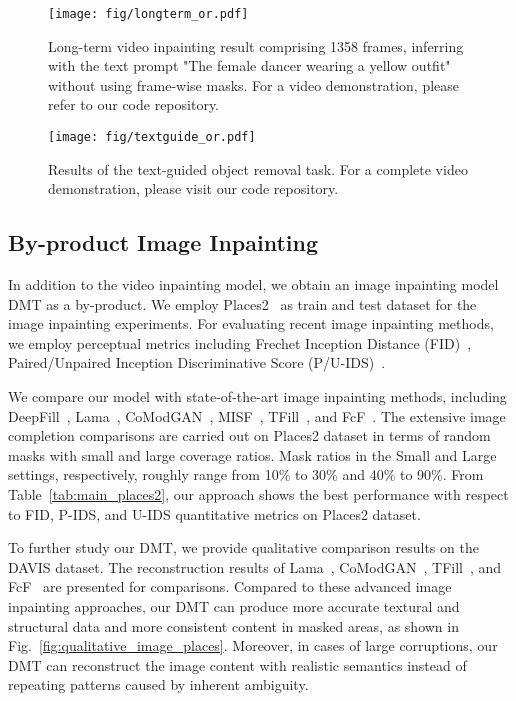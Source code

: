 \documentclass[10pt,twocolumn,letterpaper]{article}
\begin{document}
\begin{figure*}[t]
  \centering
  \texttt{[image: fig/longterm\_or.pdf]}
  \vspace{-5mm}
  \caption{Long-term video inpainting result comprising 1358 frames, inferring with the text prompt "The female dancer wearing a yellow outfit" without using frame-wise masks. For a video demonstration, please refer to our code repository.}\label{fig:longterm_or}
  \vspace{-3mm}
\end{figure*}


\begin{figure*}[t]
  \centering
  \texttt{[image: fig/textguide\_or.pdf]}
\caption{Results of the text-guided object removal task. For a complete video demonstration, please visit our code repository.}\label{fig:textguide_or}
  \vspace{-3mm}
\end{figure*}






\subsection{By-product Image Inpainting}

In addition to the video inpainting model, we obtain an image inpainting model DMT as a by-product. We employ Places2~\cite{places2} as train and test dataset for the image inpainting experiments. For evaluating recent image inpainting methods, we employ perceptual metrics including Frechet Inception Distance (FID)~\cite{DBLP:conf/nips/HeuselRUNH17}, Paired/Unpaired Inception Discriminative Score (P/U-IDS)~\cite{zhao21comod}. 

We compare our model with state-of-the-art image inpainting methods, including DeepFill~\cite{yu19free}, Lama~\cite{suvorov22lama}, CoModGAN~\cite{zhao21comod}, MISF~\cite{li22misf}, TFill~\cite{zheng22tfill}, and FcF~\cite{jain22fcf}. The extensive image completion comparisons are carried out on Places2 dataset in terms of random masks with small and large coverage ratios. Mask ratios in the Small and Large settings, respectively, roughly range from 10\% to 30\% and 40\% to 90\%. From Table~\ref{tab:main_places2}, our approach shows the best performance with respect to FID, P-IDS, and U-IDS quantitative metrics on Places2 dataset.

To further study our DMT, we provide qualitative comparison results on the DAVIS dataset. 
The reconstruction results of Lama~\cite{suvorov22lama}, CoModGAN~\cite{zhao21comod}, TFill~\cite{zheng22tfill}, and FcF~\cite{jain22fcf} are presented for comparisons.
Compared to these advanced image inpainting approaches, our DMT can produce more accurate textural and structural data and more consistent content in masked areas, as shown in Fig.~\ref{fig:qualitative_image_places}. Moreover, in cases of large corruptions, our DMT can reconstruct the image content with realistic semantics instead of repeating patterns caused by inherent ambiguity.
\end{document}
